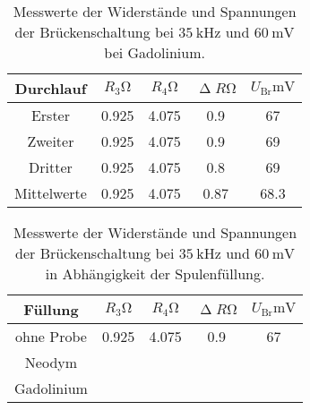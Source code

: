 \begin{table}[H]
  \centering
  \caption{Messwerte der Widerstände und Spannungen der Brückenschaltung bei $\SI{35}{\kilo\hertz}$ und $\SI{60}{\milli\volt}$ bei Gadolinium.}
  \label{tab:abmProben}
  \begin{tabular}{c| c c c c}
    \toprule
    Durchlauf & $R_3 \si{\ohm}$ & $R_4 \si{\ohm}$ & $\upDelta R \si{\ohm}$ & $U_{\text{Br}} \si{\milli\volt}$ \\
    \midrule
    Erster & 0.925 & 4.075 & 0.9 & 67 \\
    Zweiter & 0.925 & 4.075 & 0.9 & 69 \\
    Dritter & 0.925 & 4.075 & 0.8 & 69 \\
    Mittelwerte & 0.925 & 4.075 & 0.87 & 68.3\\
    \bottomrule
  \end{tabular}
\end{table}





\begin{table}[H]
  \centering
  \caption{Messwerte der Widerstände und Spannungen der Brückenschaltung bei $\SI{35}{\kilo\hertz}$ und $\SI{60}{\milli\volt}$ in Abhängigkeit der Spulenfüllung.}
  \label{tab:abmProben}
  \begin{tabular}{c| c c c c}
    \toprule
    Füllung & $R_3 \si{\ohm}$ & $R_4 \si{\ohm}$ & $\upDelta R \si{\ohm}$ & $U_{\text{Br}} \si{\milli\volt}$ \\
    \midrule
    ohne Probe & 0.925 & 4.075 & 0.9 & 67 \\
    Neodym \\
    Gadolinium \\
    \bottomrule
  \end{tabular}
\end{table}